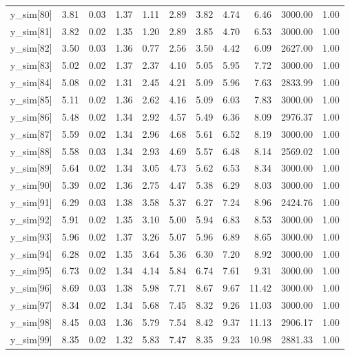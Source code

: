 \begin{table}[ht]
\begin{tabular}{rrrrrrrrrrr}
  y\_sim[80] & 3.81 & 0.03 & 1.37 & 1.11 & 2.89 & 3.82 & 4.74 & 6.46 & 3000.00 & 1.00 \\ 
  y\_sim[81] & 3.82 & 0.02 & 1.35 & 1.20 & 2.89 & 3.85 & 4.70 & 6.53 & 3000.00 & 1.00 \\ 
  y\_sim[82] & 3.50 & 0.03 & 1.36 & 0.77 & 2.56 & 3.50 & 4.42 & 6.09 & 2627.00 & 1.00 \\ 
  y\_sim[83] & 5.02 & 0.02 & 1.37 & 2.37 & 4.10 & 5.05 & 5.95 & 7.72 & 3000.00 & 1.00 \\ 
  y\_sim[84] & 5.08 & 0.02 & 1.31 & 2.45 & 4.21 & 5.09 & 5.96 & 7.63 & 2833.99 & 1.00 \\ 
  y\_sim[85] & 5.11 & 0.02 & 1.36 & 2.62 & 4.16 & 5.09 & 6.03 & 7.83 & 3000.00 & 1.00 \\ 
  y\_sim[86] & 5.48 & 0.02 & 1.34 & 2.92 & 4.57 & 5.49 & 6.36 & 8.09 & 2976.37 & 1.00 \\ 
  y\_sim[87] & 5.59 & 0.02 & 1.34 & 2.96 & 4.68 & 5.61 & 6.52 & 8.19 & 3000.00 & 1.00 \\ 
  y\_sim[88] & 5.58 & 0.03 & 1.34 & 2.93 & 4.69 & 5.57 & 6.48 & 8.14 & 2569.02 & 1.00 \\ 
  y\_sim[89] & 5.64 & 0.02 & 1.34 & 3.05 & 4.73 & 5.62 & 6.53 & 8.34 & 3000.00 & 1.00 \\ 
  y\_sim[90] & 5.39 & 0.02 & 1.36 & 2.75 & 4.47 & 5.38 & 6.29 & 8.03 & 3000.00 & 1.00 \\ 
  y\_sim[91] & 6.29 & 0.03 & 1.38 & 3.58 & 5.37 & 6.27 & 7.24 & 8.96 & 2424.76 & 1.00 \\ 
  y\_sim[92] & 5.91 & 0.02 & 1.35 & 3.10 & 5.00 & 5.94 & 6.83 & 8.53 & 3000.00 & 1.00 \\ 
  y\_sim[93] & 5.96 & 0.02 & 1.37 & 3.26 & 5.07 & 5.96 & 6.89 & 8.65 & 3000.00 & 1.00 \\ 
  y\_sim[94] & 6.28 & 0.02 & 1.35 & 3.64 & 5.36 & 6.30 & 7.20 & 8.92 & 3000.00 & 1.00 \\ 
  y\_sim[95] & 6.73 & 0.02 & 1.34 & 4.14 & 5.84 & 6.74 & 7.61 & 9.31 & 3000.00 & 1.00 \\ 
  y\_sim[96] & 8.69 & 0.03 & 1.38 & 5.98 & 7.71 & 8.67 & 9.67 & 11.42 & 3000.00 & 1.00 \\ 
  y\_sim[97] & 8.34 & 0.02 & 1.34 & 5.68 & 7.45 & 8.32 & 9.26 & 11.03 & 3000.00 & 1.00 \\ 
  y\_sim[98] & 8.45 & 0.03 & 1.36 & 5.79 & 7.54 & 8.42 & 9.37 & 11.13 & 2906.17 & 1.00 \\ 
  y\_sim[99] & 8.35 & 0.02 & 1.32 & 5.83 & 7.47 & 8.35 & 9.23 & 10.98 & 2881.33 & 1.00 \\ 

\end{tabular}
\end{table}
